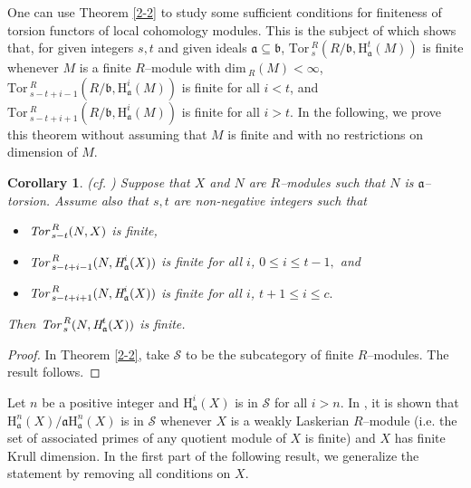 \documentclass[10pt]{amsart}
\newtheorem{cor}[thm]{Corollary}
\newcommand{\Tor}{\mbox{Tor}\,}
\renewcommand{\dim}{\mbox{dim}\,}
\renewcommand{\H}{\mbox{H}}
\newcommand{\fa}{\mathfrak{a}}
\newcommand{\fb}{\mathfrak{b}}
\begin{document}


One can use Theorem \ref {2-2} to study some sufficient conditions
for finiteness of torsion functors of local cohomology modules. This
is the subject of \cite [Theorem 4.1] {KH} which shows that, for
given integers $s, t$ and given ideals $\fa\subseteq \fb$,
$\Tor^{R}_{s}(R/\fb, \H^{t}_{\fa}(M))$ is finite whenever $M$ is a
finite $R$--module with $\dim_R(M)< \infty$, $\Tor^{R}_{s- t+ i-
1}(R/\fb, \H^{i}_{\fa}(M))$ is finite for all $i< t$, and
$\Tor^{R}_{s- t+ i +1}(R/\fb, \H^{i}_{\fa}(M))$ is finite for all
$i> t$. In the following, we prove this theorem without assuming
that $M$ is finite and with no restrictions on dimension of $M$.

\begin{cor} \label {3-1} \emph{(cf.} \cite [Theorem 4.1]{KH}\emph{)}
Suppose that $X$ and $N$ are $R$--modules such that $N$ is
$\fa$--torsion. Assume also that $s, t$ are non-negative integers
such that
               \begin{itemize}
                   \item[(i)]{$\emph{\Tor}^{R}_{s- t}(N, X)$ is finite,}
                   \item[(ii)]{$\emph{\Tor}^{R}_{s- t+ i- 1}(N, \emph{\H}^{i}_{\fa}(X))$ is finite for all $i$, $0\leq i\leq t- 1,$ and}
                   \item[(iii)]{$\emph{\Tor}^{R}_{s- t+ i +1}(N, \emph{\H}^{i}_{\fa}(X))$ is finite for all $i$, $t+ 1\leq i\leq c.$}
               \end{itemize}
Then $\emph{\Tor}^{R}_{s}(N, \emph{\H}^{t}_{\fa}(X))$ is finite.
\end{cor}

\begin{proof}
In Theorem \ref{2-2}, take $\mathcal{S}$ to be the subcategory of
finite $R$--modules. The result follows.
\end{proof}





Let $n$ be a positive integer and $\H_\fa^i(X)$ is in $\mathcal{S}$ for all $i> n$.
In \cite [Theorem 3.1] {AT}, it is shown that $\H^{n}_{\fa}(X)/\fa \H^{n}_{\fa}(X)$
is in $\mathcal{S}$ whenever $X$ is a weakly Laskerian $R$--module (i.e. the set of
associated primes of any quotient module of $X$ is finite) and $X$ has finite Krull
dimension. In the first part of the following result, we generalize the statement by
removing all conditions on $X$.
\end{document}
